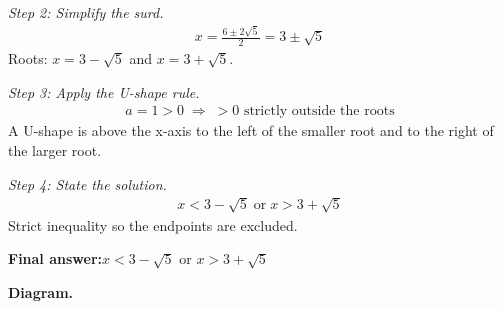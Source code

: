 \documentclass[11pt]{article}
\begin{document}
\textit{Step 2: Simplify the surd.}
\[\begin{gathered}
x = \frac{6 \pm 2\sqrt{5}}{2} = 3 \pm \sqrt{5}
\end{gathered}\]
Roots: \( x = 3 - \sqrt{5} \) and \( x = 3 + \sqrt{5} \).

\textit{Step 3: Apply the U-shape rule.}
\[\begin{gathered}
a = 1 > 0 \;\Longrightarrow\; > 0 \text{ strictly outside the roots}
\end{gathered}\]
A U-shape is above the x-axis to the left of the smaller root and to the right of the larger root.

\textit{Step 4: State the solution.}
\[\begin{gathered}
x < 3 - \sqrt{5} \;\text{or}\; x > 3 + \sqrt{5}
\end{gathered}\]
Strict inequality so the endpoints are excluded.

\begin{answerbox}
\textbf{Final answer:}\quad \(\displaystyle x < 3 - \sqrt{5}\) or \(\displaystyle x > 3 + \sqrt{5}\)
\end{answerbox}
\textbf{Diagram.}
\end{document}
